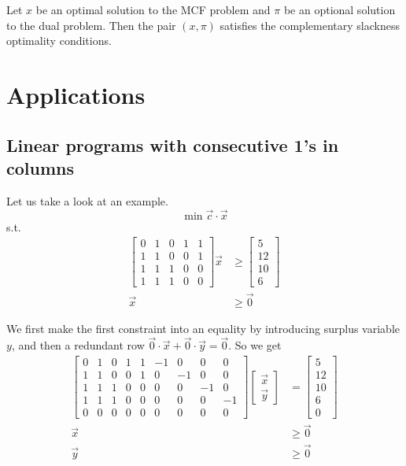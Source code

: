 \documentclass[UTF8,a4paper]{ctexart}
\begin{document}
\begin{theorem}
    Let $x$ be an optimal solution to the MCF problem and $\pi$ be an optional solution to the dual problem.
    Then the pair $(x, \pi)$ satisfies the complementary slackness optimality conditions.
\end{theorem}

\section{Applications}

\subsection{Linear programs with consecutive 1's in columns}

Let us take a look at an example.
\[
    \min \vec{c}\cdot \vec{x}
\]
s.t.
\begin{align*}
    \begin{bmatrix}
        0&1&0&1&1\\
        1&1&0&0&1\\
        1&1&1&0&0\\
        1&1&1&0&0
    \end{bmatrix}
    \vec{x} &\geq \begin{bmatrix}
        5\\
        12\\
        10\\
        6
    \end{bmatrix}
    \\
    \vec{x}&\geq \vec{0}
\end{align*}

We first make the first constraint into an equality by introducing surplus variable $y$,
and then a redundant row $\vec{0}\cdot \vec{x} + \vec{0}\cdot \vec{y}=\vec{0}$.
So we get
\begin{align*}
    \begin{bmatrix}
        0&1&0&1&1& -1&0&0&0\\
        1&1&0&0&1& 0&-1&0&0\\
        1&1&1&0&0& 0&0&-1&0\\
        1&1&1&0&0& 0&0&0&-1\\
        0&0&0&0&0& 0&0&0&0
    \end{bmatrix}
    \begin{bmatrix}
        \vec{x}\\
        \vec{y}
    \end{bmatrix}
    &=\begin{bmatrix}
        5\\
        12\\
        10\\
        6\\
        0
    \end{bmatrix}
    \\ \vec{x}&\geq \vec{0}
    \\ \vec{y}&\geq \vec{0}
\end{align*}
\end{document}
